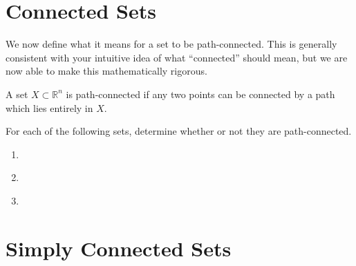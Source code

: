 \documentclass{ximera}
\begin{document}
\section{Connected Sets}

We now define what it means for a set to be path-connected. This is generally consistent with your intuitive idea of what ``connected'' should mean, but we are now able to make this mathematically rigorous.

\begin{definition}
A set $X\subset \mathbb{R}^n$ is path-connected if any two points can be connected by a path which lies entirely in $X$.
\end{definition}

\begin{problem}

For each of the following sets, determine whether or not they are path-connected.
\begin{enumerate}

\item {}
\begin{multipleChoice}
\end{multipleChoice}

\item {}
\begin{multipleChoice}
\end{multipleChoice}

\item {}
\begin{multipleChoice}
\end{multipleChoice}

\end{enumerate}
\end{problem}

\section{Simply Connected Sets}
\end{document}

